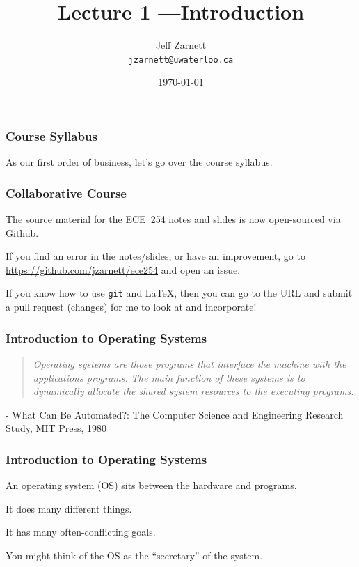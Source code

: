 

\title{Lecture 1 ---Introduction}

\author[Lam]{Jeff Zarnett \\ \small \texttt{jzarnett@uwaterloo.ca}}
\date{\today}




\begin{frame}
  \titlepage

 \end{frame}

\begin{frame}
\frametitle{Course Syllabus}

As our first order of business, let's go over the course syllabus.

\end{frame}

\begin{frame}
\frametitle{Collaborative Course}

The source material for the ECE~254 notes and slides is now open-sourced via Github. 

If you find an error in the notes/slides, or have an improvement, go to \url{https://github.com/jzarnett/ece254} and open an issue. 

If you know how to use \texttt{git} and \LaTeX, then you can go to the URL and submit a pull request (changes) for me to look at and incorporate!


\end{frame}

\begin{frame}
\frametitle{Introduction to Operating Systems}

\begin{quote}
\textit{Operating systems are those programs that interface the machine with the applications programs. The main function of these systems is to dynamically allocate the shared system resources to the executing programs.}
\end{quote}

\hfill - What Can Be Automated?: The Computer Science and Engineering Research Study, MIT Press, 1980

\end{frame}

\begin{frame}
\frametitle{Introduction to Operating Systems}

An operating system (OS) sits between the hardware and programs.

It does many different things.

It has many often-conflicting goals.

You might think of the OS as the ``secretary'' of the system.

\end{frame}

